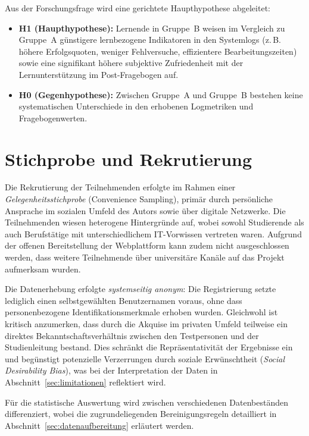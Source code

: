 Aus der Forschungsfrage wird eine gerichtete Haupthypothese abgeleitet:

\begin{itemize}
    \item \textbf{H1 (Haupthypothese):} Lernende in Gruppe~B weisen im Vergleich zu Gruppe~A günstigere lernbezogene Indikatoren in den Systemlogs (z.\,B. höhere Erfolgsquoten, weniger Fehlversuche, effizientere Bearbeitungszeiten) sowie eine signifikant höhere subjektive Zufriedenheit mit der Lernunterstützung im Post-Fragebogen auf.
    \item \textbf{H0 (Gegenhypothese):} Zwischen Gruppe~A und Gruppe~B bestehen keine systematischen Unterschiede in den erhobenen Logmetriken und Fragebogenwerten.
\end{itemize}


\section{Stichprobe und Rekrutierung}\label{sec:stichprobe}\label{subsec:gruppenzuweisung}

Die Rekrutierung der Teilnehmenden erfolgte im Rahmen einer \textit{Gelegenheitsstichprobe} (Convenience Sampling), primär durch persönliche Ansprache im sozialen Umfeld des Autors sowie über digitale Netzwerke. Die Teilnehmenden wiesen heterogene Hintergründe auf, wobei sowohl Studierende als auch Berufstätige mit unterschiedlichem IT-Vorwissen vertreten waren. Aufgrund der offenen Bereitstellung der Webplattform kann zudem nicht ausgeschlossen werden, dass weitere Teilnehmende über universitäre Kanäle auf das Projekt aufmerksam wurden.

Die Datenerhebung erfolgte \textit{systemseitig anonym}: Die Registrierung setzte lediglich einen selbstgewählten Benutzernamen voraus, ohne dass personenbezogene Identifikationsmerkmale erhoben wurden. Gleichwohl ist kritisch anzumerken, dass durch die Akquise im privaten Umfeld teilweise ein direktes Bekanntschaftsverhältnis zwischen den Testpersonen und der Studienleitung bestand. Dies schränkt die Repräsentativität der Ergebnisse ein und begünstigt potenzielle Verzerrungen durch soziale Erwünschtheit (\textit{Social Desirability Bias}), was bei der Interpretation der Daten in Abschnitt~\ref{sec:limitationen} reflektiert wird.

Für die statistische Auswertung wird zwischen verschiedenen Datenbeständen differenziert, wobei die zugrundeliegenden Bereinigungsregeln detailliert in Abschnitt~\ref{sec:datenaufbereitung} erläutert werden.

